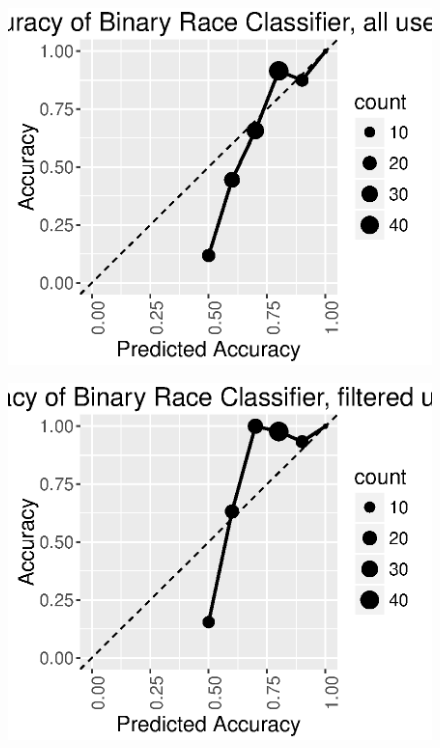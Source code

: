 \begin{figure}[h]
  \centering
  \begin{minipage}{.21\textwidth}
    \centering
    \includegraphics[width=\linewidth]{fig/census/accuracy_race_all.eps}
    \label{fig:accuracy_race_all}
  \end{minipage}
  \begin{minipage}{.21\textwidth}
    \centering
    \includegraphics[width=\linewidth]{fig/census/accuracy_race_filtered.eps}
    \label{fig:accuracy_race_filtered}
  \end{minipage}
  \label{fig:accuracy_race}
\end{figure}

